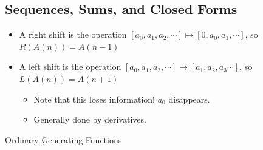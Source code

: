 \hypertarget{sequences-sums-and-closed-forms}{%
\subsection{Sequences, Sums, and Closed
Forms}\label{sequences-sums-and-closed-forms}}

\begin{itemize}
\tightlist
\item
  A right shift is the operation
  \([a_0, a_1, a_2, \cdots] \mapsto [0, a_0, a_1, \cdots]\), so
  \(R(A(n)) = A(n-1)\)
\item
  A left shift is the operation
  \([a_0, a_1, a_2, \cdots] \mapsto [a_1, a_2, a_3 \cdots]\), so
  \(L(A(n)) = A(n+1)\)

  \begin{itemize}
  \tightlist
  \item
    Note that this loses information! \(a_0\) disappears.
  \item
    Generally done by derivatives.
  \end{itemize}
\end{itemize}

Ordinary Generating Functions

